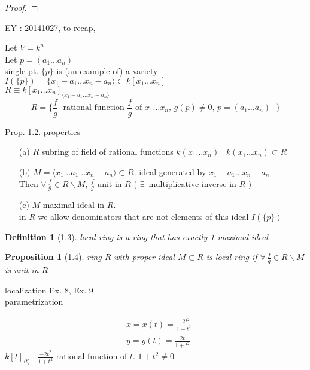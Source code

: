 \documentclass[10pt]{amsart}
\newtheorem{proposition}{Proposition}
\newtheorem{definition}{Definition}
\newcommand{\exercisehead}[1]
  { \smallskip
   \noindent{\small\bf Exercise #1.}
  }
\begin{document}
\begin{multicols*}{2}
\begin{proof}
\end{proof}

EY : 20141027, to recap, 

Let $V = k^n$ \\
Let $p = (a_1 \dots a_n)$ \\
single pt. $\lbrace p \rbrace$ is (an example of) a variety \\
$I(\lbrace p \rbrace) = \lbrace x_1 -a_1 \dots x_n -a_n \rangle \subset k[x_1 \dots x_n]$ \\

$R \equiv k[x_1 \dots x_n]_{\langle x_1 - a_1 \dots x_n-a_n \rangle }$ 
\[
R = \lbrace \frac{f}{g} | \text{ rational function $\frac{f}{g}$ of $x_1 \dots x_n$, $g(p) \neq 0$, $p=(a_1 \dots a_n) $ } \rbrace
\]

Prop. 1.2. properties 

\begin{enumerate}
\item[(a)] $R$ subring of field of rational functions $k(x_1 \dots x_n)$ \quad \, $k(x_1 \dots x_n) \subset R$ 
\item[(b)] $M = \langle x_1 \dots a_1 \dots x_n -a_n \rangle \subset R$.  ideal generated by $x_1 - a_1 \dots x_n-a_n$ \\
Then $\forall \, \frac{f}{g} \in R\backslash M$, $\frac{f}{g}$ unit in $R$ ( $\exists \, $ multiplicative inverse in $R$ )
\item[(c)] $M$ maximal ideal in $R$. \\
in $R$ we allow denominators that are not elements of this ideal $I(\lbrace p \rbrace)$ 
\end{enumerate}

\begin{definition}[1.3] local ring is a ring that has exactly 1 maximal ideal \end{definition}

\begin{proposition}[1.4] ring $R$ with proper ideal $M\subset R$ is local ring if $\forall \, \frac{f}{g} \in R\backslash M$ is unit in $R$
\end{proposition}

localization Ex. 8, Ex. 9 \\
parametrization

\exercisehead{2} \[
\begin{aligned}
  & x = x(t) = \frac{-2t^2 }{1+t^2} \\ 
 &  y = y(t) = \frac{2t}{1+t^2}
\end{aligned}
\]
$k[t]_{\langle t \rangle}$ \quad \, $\frac{-2t^2}{1+t^2}$ rational function of $t$.  $1+t^2 \neq 0$


\end{multicols*}
\end{document}
